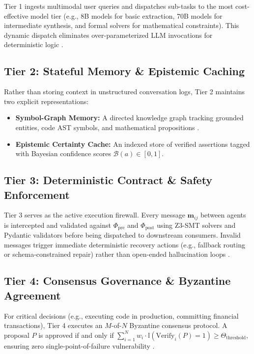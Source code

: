 \documentclass[10pt,twocolumn,letterpaper]{article}
\begin{document}
Tier 1 ingests multimodal user queries and dispatches sub-tasks to the most cost-effective model tier (e.g., 8B models for basic extraction, 70B models for intermediate synthesis, and formal solvers for mathematical constraints). This dynamic dispatch eliminates over-parameterized LLM invocations for deterministic logic \cite{arxiv_2005_14165,arxiv_2305_18290}.


\subsection{Tier 2: Stateful Memory \& Epistemic Caching}

Rather than storing context in unstructured conversation logs, Tier 2 maintains two explicit representations:
\begin{itemize}
  \item \textbf{Symbol-Graph Memory:} A directed knowledge graph tracking grounded entities, code AST symbols, and mathematical propositions \cite{crossref_10_1145_3689096_3689462}.
  \item \textbf{Epistemic Certainty Cache:} An indexed store of verified assertions tagged with Bayesian confidence scores $\mathcal{B}(a) \in [0, 1]$.
\end{itemize}


\subsection{Tier 3: Deterministic Contract \& Safety Enforcement}

Tier 3 serves as the active execution firewall. Every message $\mathbf{m}_{ij}$ between agents is intercepted and validated against $\Phi_{\text{pre}}$ and $\Phi_{\text{post}}$ using Z3-SMT solvers and Pydantic validators before being dispatched to downstream consumers. Invalid messages trigger immediate deterministic recovery actions (e.g., fallback routing or schema-constrained repair) rather than open-ended hallucination loops \cite{arxiv_2404_01131}.


\subsection{Tier 4: Consensus Governance \& Byzantine Agreement}

For critical decisions (e.g., executing code in production, committing financial transactions), Tier 4 executes an $M$-of-$N$ Byzantine consensus protocol. A proposal $P$ is approved if and only if $\sum_{i=1}^N w_i \cdot \mathbb{I}(\text{Verify}_i(P) = 1) \ge \Theta_{\text{threshold}}$, ensuring zero single-point-of-failure vulnerability \cite{crossref_10_1109_access_2026_3656309}.
\end{document}
